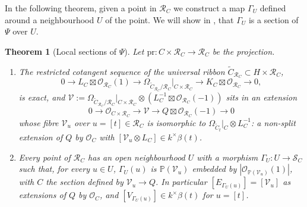 \documentclass[11pt,reqno]{amsart}
\theoremstyle{plain}
\newtheorem{theorem}{Theorem}[section]
\theoremstyle{definition}
\newcommand{\PP}{\mathbb{P}}
\newcommand{\OO}{\mathcal{O}}
\newcommand{\Ct}{\widetilde{C}}
\newcommand{\SC}{\mathcal{S}_C}
\newcommand{\RC}{\mathcal{R}_C}
\newcommand{\pr}{\mathrm{pr}}
\begin{document}
In the following theorem, given a point in $\mathcal{R}_C$ we construct a map $\Gamma_U$ defined around a neighbourhood $U$ of the point. We will show in , that $\Gamma_U$ is a section of $\Psi$ over $U$.

\begin{theorem}[Local sections of $\Psi$]\label{thm:Gamma}
Let $\pr\colon C\times\RC\to\RC$ be the projection.
\begin{enumerate}
\item The restricted cotangent sequence of the universal ribbon $\Ct_{\RC}\subset H\times\RC$,
\begin{equation}\label{eq:relcot}
0\to L_C\boxtimes\OO_{\RC}(1)\to\Omega_{\Ct_{\RC}/\RC}|_{C\times\RC}\to K_C\boxtimes\OO_{\RC}\to0,
\end{equation}
is exact, and $\mathcal{V}:=\Omega_{\Ct_{\RC}/\RC}|_{C\times\RC}\otimes(L_C^{-1}\boxtimes\OO_{\RC}(-1))$ sits in an extension
\begin{equation}\label{eq:VR}
0\to\OO_{C\times\RC}\to\mathcal{V}\to Q\boxtimes\OO_{\RC}(-1)\to0
\end{equation}
whose fibre $\mathcal{V}_u$ over $u=[t]\in\RC$ is isomorphic to $\Omega_{\Ct_t}|_C\otimes L_C^{-1}$: a non-split extension of $Q$ by $\OO_C$ with $[\mathcal{V}_u\otimes L_C]\in k^{\times}\beta(t)$.
\item Every point of $\RC$ has an open neighbourhood $U$ with a morphism $\Gamma_U\colon U\to\SC$ such that, for every $u\in U$, $\Gamma_U(u)$ is $\PP(\mathcal{V}_u)$ embedded by $|\OO_{\PP(\mathcal{V}_u)}(1)|$, with $C$ the section defined by $\mathcal{V}_u\to Q$. In particular $[E_{\Gamma_U(u)}]=[\mathcal{V}_u]$ as extensions of $Q$ by $\OO_C$, and $[V_{\Gamma_U(u)}]\in k^{\times}\beta(t)$ for $u=[t]$.
\end{enumerate}
\end{theorem}
\end{document}
